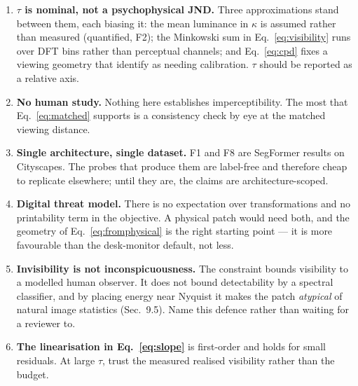 \documentclass[11pt,a4paper]{article}
\begin{document}
\begin{enumerate}
\item \textbf{$\tau$ is nominal, not a psychophysical JND.} Three
  approximations stand between them, each biasing it: the mean luminance in
  $\kappa$ is assumed rather than measured (quantified, F2); the Minkowski
  sum in Eq.~\eqref{eq:visibility} runs over DFT bins rather than perceptual
  channels; and Eq.~\eqref{eq:cpd} fixes a viewing geometry that
  \citet[Sec.~6]{galinska2026csflow} identify as needing calibration.
  $\tau$ should be reported as a relative axis.
\item \textbf{No human study.} Nothing here establishes imperceptibility.
  The most that Eq.~\eqref{eq:matched} supports is a consistency check by
  eye at the matched viewing distance.
\item \textbf{Single architecture, single dataset.} F1 and F8 are SegFormer
  results on Cityscapes. The probes that produce them are label-free and
  therefore cheap to replicate elsewhere; until they are, the claims are
  architecture-scoped.
\item \textbf{Digital threat model.} There is no expectation over
  transformations \citep{athalye2018eot} and no printability term
  \citep{sharif2016nps} in the objective. A physical patch would need both,
  and the geometry of Eq.~\eqref{eq:fromphysical} is the right starting
  point --- it is more favourable than the desk-monitor default, not less.
\item \textbf{Invisibility is not inconspicuousness.} The constraint bounds
  visibility to a modelled human observer. It does not bound detectability
  by a spectral classifier, and by placing energy near Nyquist it makes the
  patch \emph{atypical} of natural image statistics (Sec.~9.5). Name this
  defence rather than waiting for a reviewer to.
\item \textbf{The linearisation in Eq.~\eqref{eq:slope}} is first-order and
  holds for small residuals. At large $\tau$, trust the measured realised
  visibility rather than the budget.
\end{enumerate}



\end{document}
